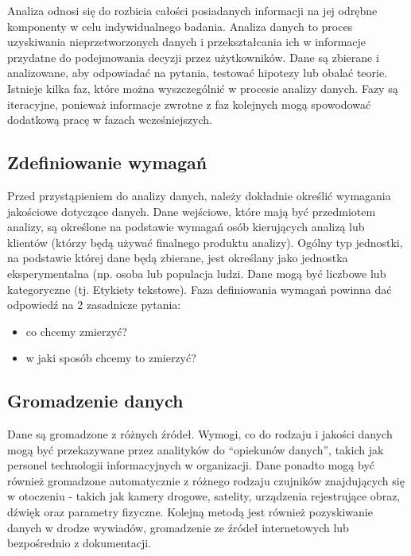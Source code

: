 \documentclass[
  polish,
  letterpaper,
  DIV=11,
  numbers=noendperiod]{scrreprt}
\providecommand{\tightlist}{%
  \setlength{\itemsep}{0pt}\setlength{\parskip}{0pt}}
\begin{document}
Analiza odnosi się do rozbicia całości posiadanych informacji na jej
odrębne komponenty w celu indywidualnego badania. Analiza danych to
proces uzyskiwania nieprzetworzonych danych i przekształcania ich w
informacje przydatne do podejmowania decyzji przez użytkowników. Dane są
zbierane i analizowane, aby odpowiadać na pytania, testować hipotezy lub
obalać teorie. Istnieje kilka faz, które można wyszczególnić w procesie
analizy danych. Fazy są iteracyjne, ponieważ informacje zwrotne z faz
kolejnych mogą spowodować dodatkową pracę w fazach wcześniejszych.

\subsection{Zdefiniowanie wymagań}\label{zdefiniowanie-wymagaux144}

Przed przystąpieniem do analizy danych, należy dokładnie określić
wymagania jakościowe dotyczące danych. Dane wejściowe, które mają być
przedmiotem analizy, są określone na podstawie wymagań osób kierujących
analizą lub klientów (którzy będą używać finalnego produktu analizy).
Ogólny typ jednostki, na podstawie której dane będą zbierane, jest
określany jako jednostka eksperymentalna (np. osoba lub populacja ludzi.
Dane mogą być liczbowe lub kategoryczne (tj. Etykiety tekstowe). Faza
definiowania wymagań powinna dać odpowiedź na 2 zasadnicze pytania:

\begin{itemize}
\tightlist
\item
  co chcemy zmierzyć?
\item
  w jaki sposób chcemy to zmierzyć?
\end{itemize}

\subsection{Gromadzenie danych}\label{gromadzenie-danych}

Dane są gromadzone z różnych źródeł. Wymogi, co do rodzaju i jakości
danych mogą być przekazywane przez analityków do ``opiekunów danych'',
takich jak personel technologii informacyjnych w organizacji. Dane
ponadto mogą być również gromadzone automatycznie z różnego rodzaju
czujników znajdujących się w otoczeniu - takich jak kamery drogowe,
satelity, urządzenia rejestrujące obraz, dźwięk oraz parametry fizyczne.
Kolejną metodą jest również pozyskiwanie danych w drodze wywiadów,
gromadzenie ze źródeł internetowych lub bezpośrednio z dokumentacji.
\end{document}
